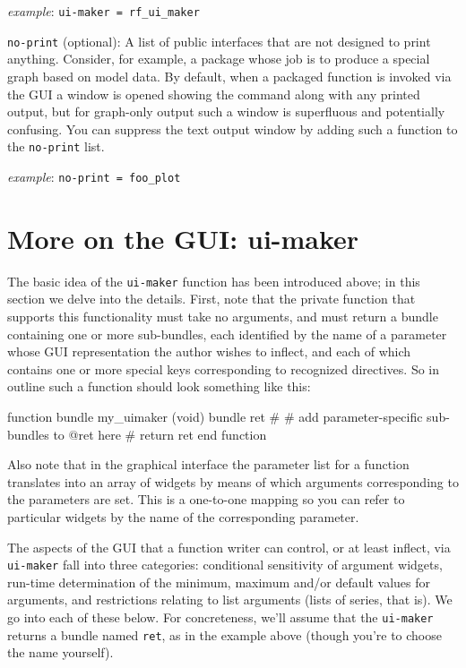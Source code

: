 \documentclass[oneside]{book}
\newcommand{\ttusage}[1]{\textit{example}: \quad \texttt{#1}}
\begin{document}
\begin{description}
  \ttusage{ui-maker = rf\_ui\_maker}

\item \texttt{no-print} (optional): A list of public interfaces that
  are not designed to print anything.  Consider, for example, a
  package whose job is to produce a special graph based on model data.
  By default, when a packaged function is invoked via the GUI a window
  is opened showing the command along with any printed output, but for
  graph-only output such a window is superfluous and potentially
  confusing. You can suppress the text output window by adding such a
  function to the \texttt{no-print} list.

  \ttusage{no-print = foo\_plot}

\end{description}

\section{More on the GUI: ui-maker}
\label{sec:ui-maker}

The basic idea of the \texttt{ui-maker} function has been introduced
above; in this section we delve into the details.  First, note that
the private function that supports this functionality must take no
arguments, and must return a bundle containing one or more
sub-bundles, each identified by the name of a parameter whose GUI
representation the author wishes to inflect, and each of which
contains one or more special keys corresponding to recognized
directives. So in outline such a function should look something like
this:

\begin{code}
function bundle my_uimaker (void)
    bundle ret
    #
    # add parameter-specific sub-bundles to @ret here
    #
    return ret
end function
\end{code}

Also note that in the graphical interface the parameter list for a
function translates into an array of widgets by means of which
arguments corresponding to the parameters are set. This is a
one-to-one mapping so you can refer to particular widgets by the name
of the corresponding parameter.

The aspects of the GUI that a function writer can control, or at least
inflect, via \texttt{ui-maker} fall into three categories: conditional
sensitivity of argument widgets, run-time determination of the
minimum, maximum and/or default values for arguments, and restrictions
relating to list arguments (lists of series, that is). We go into each
of these below. For concreteness, we'll assume that the
\texttt{ui-maker} returns a bundle named \texttt{ret}, as in the
example above (though you're to choose the name yourself).
\end{document}
